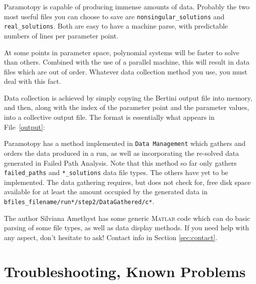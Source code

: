 Paramotopy is capable of producing immense amounts of data.  Probably the two most useful files you can choose to save are \texttt{nonsingular\_solutions} and \texttt{real\_solutions}.  Both are easy to have a machine parse, with predictable numbers of lines per parameter point.

At some points in parameter space,  polynomial systems  will be faster to solve than others.  Combined with the use of a parallel machine, this will result in data files which are out of order.  Whatever data collection method you use, you must deal with this fact.

Data collection is achieved by simply copying the Bertini output file into memory, and then, along with the index of the parameter point and the parameter values, into a collective output file.  The format is essentially what appears in File~\ref{output}:


Paramotopy has a method implemented in \texttt{Data Management} which gathers and orders the data produced in a run, as well as incorporating the re-solved data generated in Failed Path Analysis.  Note that this method so far only gathers \texttt{failed\_paths} and \texttt{*\_solutions} data file types.  The others have yet to be implemented.  The data gathering requires, but does not check for, free disk space available for at least the amount occupied by the generated data in \texttt{bfiles\_filename/run*/step2/DataGathered/c*}.


The author Silviana Amethyst has some generic \textsc{Matlab} code which can do basic parsing of some file types, as well as data display methods.   If you need help with any aspect, don't hesitate to ask! Contact info in Section \ref{sec:contact}.







\clearpage
\section{Troubleshooting, Known Problems}
\label{sec:troubleshooting}

